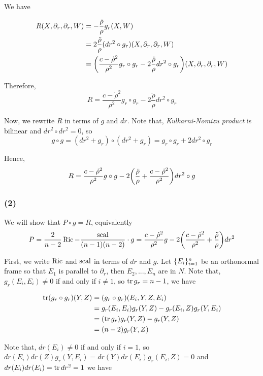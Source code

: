 We have

\begin{align*}
	R(X, \partial_r, \partial_r, W) 
	&= - \frac{\ddot{\rho}}{\rho} g_r(X, W) \\
	&= 2 \frac{\ddot{\rho}}{\rho} (dr^2 \circ g_r)(X, \partial_r, \partial_r, W) \\
	&= \tuple*{\frac{c - \dot{\rho}^2}{\rho^2} g_r \circ g_r - 2 \frac{\ddot{\rho}}{\rho} dr^2 \circ g_r} (X, \partial_r, \partial_r, W)
\end{align*}

Therefore, 
$$
	R = \frac{c - \dot{\rho}^2}{\rho^2} g_r \circ g_r - 2 \frac{\ddot{\rho}}{\rho} dr^2 \circ g_r
$$

Now, we rewrite $R$ in terms of $g$ and $dr$. Note that, \textit{Kulkarni-Nomizu product} is bilinear and $dr^2 \circ dr^2 = 0$, so
$$
	g \circ g = (dr^2 + g_r) \circ (dr^2 + g_r) = g_r \circ g_r + 2 dr^2 \circ g_r
$$

Hence,
$$
	R = \frac{c - \dot{\rho}^2}{\rho^2} g \circ g - 2 \tuple*{\frac{\ddot{\rho}}{\rho} + \frac{c - \dot{\rho}^2}{\rho^2}} dr^2 \circ g
$$


\subsubsection{(2)}

We will show that $P \circ g = R$, equivalently
$$
	P = \frac{2}{n-2} \Ric - \frac{\scal}{(n-1)(n-2)} \cdot g = \frac{c - \dot{\rho}^2}{\rho^2} g - 2 \tuple*{\frac{c - \dot{\rho}^2}{\rho^2}  + \frac{\ddot{\rho}}{\rho}} dr^2
$$	

First, we write $\operatorname{Ric}$ and $\operatorname{scal}$ in terms of $dr$ and $g$. Let $\{E_i\}_{i=1}^n$ be an orthonormal frame so that $E_1$ is parallel to $\partial_r$, then $E_2, ..., E_n$ are in $N$. Note that, $g_r(E_i, E_i) \neq 0$ if and only if $i \neq 1$, so $\operatorname{tr} g_r = n-1$, we have

\begin{align*}
	\operatorname{tr} (g_r \circ g_r)(Y, Z)
	&= (g_r \circ g_r)(E_i, Y, Z, E_i) \\
	&= g_r(E_i, E_i) g_r(Y, Z) - g_r(E_i, Z) g_r(Y, E_i) \\
	&= (\operatorname{tr} g_r ) g_r(Y, Z) - g_r(Y, Z) \\
	&= (n-2) g_r(Y, Z)
\end{align*}

Note that, $dr(E_i) \neq 0$ if and only if $i = 1$, so $dr(E_i) dr(Z) g_r(Y, E_i) = dr(Y) dr(E_i) g_r(E_i, Z) = 0$ and $dr(E_i)dr(E_i) = \operatorname{tr} dr^2 = 1$ we have

